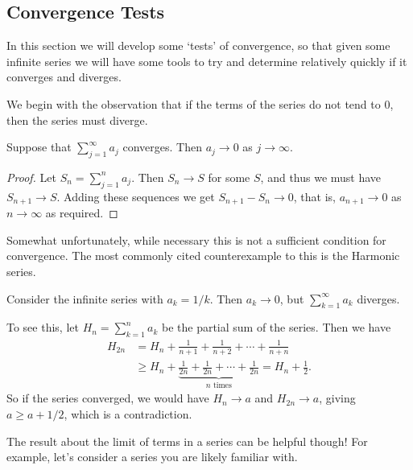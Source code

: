 
\subsection{Convergence Tests}

In this section we will develop some `tests' of convergence, so that given some infinite series we will have some tools to try and determine relatively quickly if it converges and diverges.

We begin with the observation that if the terms of the series do not tend to 0, then the series must diverge.

\begin{proposition}\label{prop:limit-of-terms}
	Suppose that $\sum_{j = 1}^{\infty} a_j$ converges. Then $a_j \rightarrow 0$ as $j \rightarrow \infty$.
\end{proposition}
\begin{proof}
	Let $S_n = \sum_{j = 1}^{n} a_j$. Then $S_n \rightarrow S$ for some $S$, and thus we must have $S_{n + 1} \rightarrow S$. Adding these sequences we get $S_{n+1} - S_{n} \rightarrow 0$, that is, $a_{n + 1} \rightarrow 0$ as $n \rightarrow \infty$ as required.
\end{proof}

Somewhat unfortunately, while necessary this is not a sufficient condition for convergence. The most commonly cited counterexample to this is the Harmonic series.

\begin{example}
	Consider the infinite series with $a_k = 1/k$. Then $a_k \rightarrow 0$, but $\sum_{k = 1}^\infty a_k$ diverges.

	To see this, let $H_n = \sum_{k = 1}^n a_k$ be the partial sum of the series. Then we have
	\begin{align*}
		H_{2n} &= H_n + \frac{1}{n + 1} + \frac{1}{n + 2} + \cdots + \frac{1}{n + n} \\
		&\geq  H_n + \underbrace{\frac{1}{2n} + \frac{1}{2n} + \cdots + \frac{1}{2n}}_{\text{$n$ times}} = H_n + \frac{1}{2}.
	\end{align*}
	So if the series converged, we would have $H_n \rightarrow a$ and $H_{2n} \rightarrow a$, giving $a \geq a + 1/2$, which is a contradiction.
\end{example}

The result about the limit of terms in a series can be helpful though! For example, let's consider a series you are likely familiar with.

